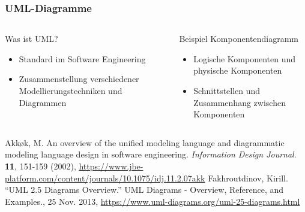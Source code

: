 \documentclass[xcolor=dvipsnames]{beamer}
\begin{document}
	
	
	
	
	\begin{frame}
		\frametitle{UML-Diagramme}
		\begin{columns}
			\begin{column}{0.50\textwidth}
				\begin{block}{Was ist UML?}
					\begin{itemize}
						\item Standard im Software Engineering
						\item Zusammenstellung verschiedener Modellierungstechniken und Diagrammen
					\end{itemize}
				\end{block}
			\end{column}
			
			\begin{column}{0.50\textwidth}
				\begin{block}{Beispiel Komponentendiagramm}
						\begin{itemize}
							\item Logische Komponenten und physische Komponenten 
							\item Schnittstellen und Zusammenhang zwischen Komponenten
						\end{itemize}
					\begin{minipage}{1.0\textwidth}	
			\end{minipage}
		
				\end{block}
			\end{column}
		\end{columns}
		\begin{thebibliography}{00}
			\tiny
			
			Akkøk, M. An overview of the unified modeling language and diagrammatic modeling language design in software engineering. {\em Information Design Journal}. \textbf{11}, 151-159 (2002), \url{https://www.jbe-platform.com/content/journals/10.1075/idj.11.2.07akk}
			 Fakhroutdinov, Kirill. “UML 2.5 Diagrams Overview.” UML Diagrams - Overview, Reference, and Examples., 25 Nov. 2013, \url{https://www.uml-diagrams.org/uml-25-diagrams.html} 
			
		\end{thebibliography}
	\end{frame}
	
\end{document}
